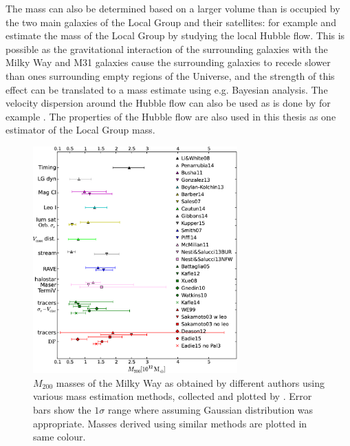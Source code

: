 \documentclass[english, oneside]{HYgradu}
\begin{document}

The mass can also be determined based on a larger volume than is occupied by the two main galaxies of the Local Group and their satellites: for example \citet{penarrubia2014dynamical} and \citet{fattahi2016apostle} estimate the mass of the Local Group by studying the local Hubble flow. This is possible as the gravitational interaction of the surrounding galaxies with the Milky Way and M31 galaxies cause the surrounding galaxies to recede slower than ones surrounding empty regions of the Universe, and the strength of this effect can be translated to a mass estimate using e.g. Bayesian analysis. The velocity dispersion around the Hubble flow can also be used as is done by for example \citet{gonzalez2014mass}. The properties of the Hubble flow are also used in this thesis as one estimator of the Local Group mass.

\begin{figure}
   \centering
   \includegraphics[width=0.7\textwidth]{kuvat/wang2015-masses.png}
   \caption{$M_{200}$ masses of the Milky Way as obtained by different authors using various mass estimation methods, collected and plotted by \citet{wang2015estimating}. Error bars show the $1\sigma$ range where assuming Gaussian distribution was appropriate. Masses derived using similar methods are plotted in same colour.}
   \label{fig:wang-masses}
\end{figure}
\end{document}
